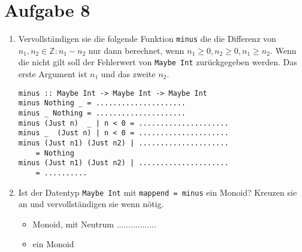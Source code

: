 \documentclass{article}
\begin{document}
\section*{Aufgabe 8}
\begin{enumerate} [label={\alph*)}]
    \item Vervollständigen sie die folgende Funktion \texttt{minus} die die Differenz von $n_1, n_2 \in \mathbb{Z}: n_1 - n_2$ nur dann berechnet, wenn $n_1 \geq 0, n_2 \geq 0, n_1 \geq n_2$. Wenn die nicht gilt soll der Fehlerwert von \texttt{Maybe Int} zurückgegeben werden. Das erste Argument ist $n_1$ und das zweite $n_2$.

\begin{verbatim}
minus :: Maybe Int -> Maybe Int -> Maybe Int
minus Nothing _ = .....................
minus _ Nothing = .....................
minus (Just n)  _ | n < 0 = .....................
minus _  (Just n) | n < 0 = .....................
minus (Just n1) (Just n2) | .....................
    = Nothing
minus (Just n1) (Just n2) | .....................
    = ..........
\end{verbatim}

    \item Ist der Datentyp \texttt{Maybe Int} mit \texttt{mappend = minus} ein Monoid? Kreuzen sie an und vervollständigen sie wenn nötig.
        \begin{itemize}[label=$\square$]
            \item Monoid, mit Neutrum .................
            \item ein Monoid
        \end{itemize}

\end{enumerate}
\end{document}
